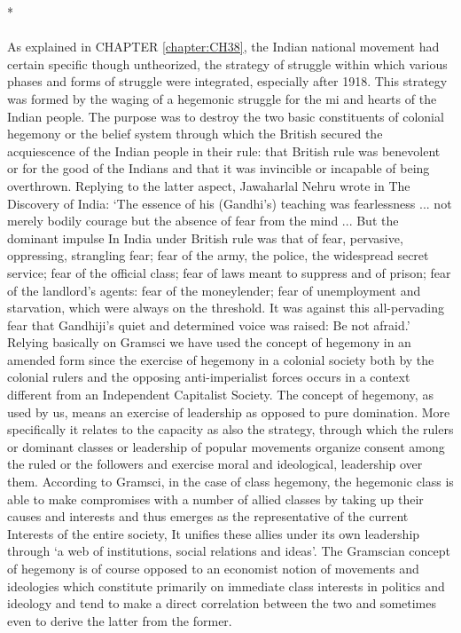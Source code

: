 \begin{multicols}{2}
\begin{center}*\end{center}

\paragraph*{}
As explained in CHAPTER \ref{chapter:CH38}, the Indian national movement had certain specific though untheorized, the strategy of struggle within which various phases and forms of struggle were integrated, especially after 1918. This strategy was formed by the waging of a hegemonic struggle for the mi and hearts of the Indian people. The purpose was to destroy the two basic constituents of colonial hegemony or the belief system through which the British secured the acquiescence of the Indian people in their rule: that British rule was benevolent or for the good of the Indians and that it was invincible or incapable of being overthrown. Replying to the latter aspect, Jawaharlal Nehru wrote in The Discovery of India: `The essence of his (Gandhi's) teaching was fearlessness ... not merely bodily courage but the absence of fear from the mind ... But the dominant impulse In India under British rule was that of fear, pervasive, oppressing, strangling fear; fear of the army, the police, the widespread secret service; fear of the official class; fear of laws meant to suppress and of prison; fear of the landlord's agents: fear of the money­lender; fear of unemployment and starvation, which were always on the threshold. It was against this all-pervading fear that Gandhiji's quiet and determined voice was raised: Be not afraid.' Relying basically on Gramsci we have used the concept of hegemony in an amended form since the exercise of hegemony in a colonial society both by the colonial rulers and the opposing anti-imperialist forces occurs in a context different from an Independent Capitalist Society. The concept of hegemony, as used by us, means an exercise of leadership as opposed to pure domination. More specifically it relates to the capacity as also the strategy, through which the rulers or dominant classes or leadership of popular movements organize consent among the ruled or the followers and exercise moral and ideological, leadership over them. According to Gramsci, in the case of class hegemony, the hegemonic class is able to make compromises with a number of allied classes by taking up their causes and interests and thus emerges as the representative of the current Interests of the entire society, It unifies these allies under its own leadership through `a web of institutions, social relations and ideas'. The Gramscian concept of hegemony is of course opposed to an economist notion of movements and ideologies which constitute primarily on immediate class interests in politics and ideology and tend to make a direct correlation between the two and sometimes even to derive the latter from the former.


\end{multicols}
